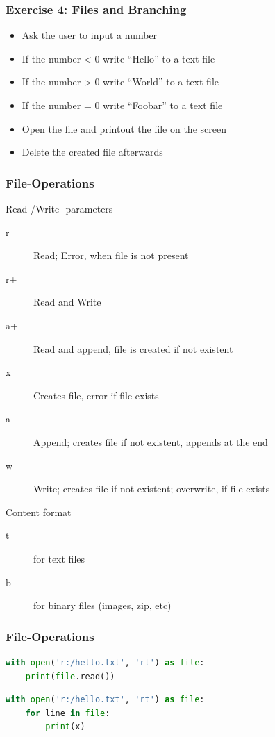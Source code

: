 \documentclass[ngerman]{beamer}
\begin{document}
\begin{frame}
\frametitle{Exercise 4: Files and Branching}


\begin{itemize}
\item Ask the user to input a number
\item If the number < 0 write \enquote{Hello} to a text file
\item If the number > 0 write \enquote{World} to a text file
\item If the number = 0 write \enquote{Foobar} to a text file
\item Open the file and printout the file on the screen
\item Delete the created file afterwards
\end{itemize}
\end{frame}

\begin{frame}[containsverbatim]
\frametitle{File-Operations}

Read-/Write- parameters

\begin{description}
\item [r] Read; Error, when file is not present
\item [r+] Read and Write
\item [a+] Read and append, file is created if not existent
\item [x] Creates file, error if file exists
\item [a] Append; creates file if not existent, appends at the end
\item [w] Write; creates file if not existent; overwrite, if file exists
\end{description}

Content format

\begin{description}
\item[t] for text files
\item[b] for binary files (images, zip, etc)
\end{description}

\end{frame}

\begin{frame}[containsverbatim]
\frametitle{File-Operations}

\begin{lstlisting}[language=Python,caption={Read a complete file}]
with open('r:/hello.txt', 'rt') as file:  
    print(file.read())
\end{lstlisting}

\begin{lstlisting}[language=Python,caption={Row-wise reading a file}]
with open('r:/hello.txt', 'rt') as file:  
    for line in file:
        print(x)
\end{lstlisting}

\end{frame}
\end{document}
